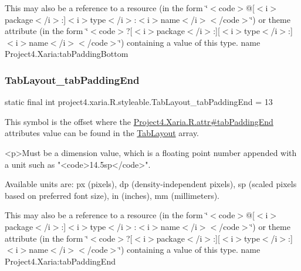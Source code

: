 This may also be a reference to a resource (in the form \char`\"{}$<$code$>$@\mbox{[}$<$i$>$package$<$/i$>$\+:\mbox{]}$<$i$>$type$<$/i$>$\+:$<$i$>$name$<$/i$>$$<$/code$>$\char`\"{}) or theme attribute (in the form \char`\"{}$<$code$>$?\mbox{[}$<$i$>$package$<$/i$>$\+:\mbox{]}\mbox{[}$<$i$>$type$<$/i$>$\+:\mbox{]}$<$i$>$name$<$/i$>$$<$/code$>$\char`\"{}) containing a value of this type.  name Project4.\+Xaria\+:tab\+Padding\+Bottom \mbox{\label{classproject4_1_1xaria_1_1R_1_1styleable_a5e2194c0ed2bb35846788cfeed3fcb22}} 
\subsubsection{\texorpdfstring{Tab\+Layout\+\_\+tab\+Padding\+End}{TabLayout\_tabPaddingEnd}}
{\footnotesize\ttfamily static final int project4.\+xaria.\+R.\+styleable.\+Tab\+Layout\+\_\+tab\+Padding\+End = 13\hspace{0.3cm}{\ttfamily [static]}}

This symbol is the offset where the \hyperlink{}{Project4.\+Xaria.\+R.\+attr\#tab\+Padding\+End} attribute\textquotesingle{}s value can be found in the \hyperlink{classproject4_1_1xaria_1_1R_1_1styleable_ab6bfb1f97ae9fba16f4f90d50871d4a8}{Tab\+Layout} array.

\begin{DoxyVerb}      <p>Must be a dimension value, which is a floating point number appended with a unit such as "<code>14.5sp</code>".
\end{DoxyVerb}
 Available units are\+: px (pixels), dp (density-\/independent pixels), sp (scaled pixels based on preferred font size), in (inches), mm (millimeters). 

This may also be a reference to a resource (in the form \char`\"{}$<$code$>$@\mbox{[}$<$i$>$package$<$/i$>$\+:\mbox{]}$<$i$>$type$<$/i$>$\+:$<$i$>$name$<$/i$>$$<$/code$>$\char`\"{}) or theme attribute (in the form \char`\"{}$<$code$>$?\mbox{[}$<$i$>$package$<$/i$>$\+:\mbox{]}\mbox{[}$<$i$>$type$<$/i$>$\+:\mbox{]}$<$i$>$name$<$/i$>$$<$/code$>$\char`\"{}) containing a value of this type.  name Project4.\+Xaria\+:tab\+Padding\+End \mbox{\label{classproject4_1_1xaria_1_1R_1_1styleable_a14c5feee7b7d3f34cae3fc0247483fb2}} 
